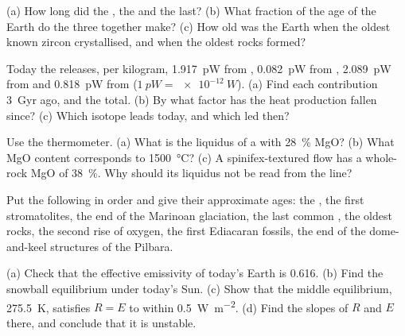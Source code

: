 \begin{exercise}[$\star$]\label{exo:b2:precambrian-earth:1}
(a) How long did the , the  and the  last? (b) What fraction of the age
of the Earth do the three together make? (c) How old was the Earth when the oldest known zircon
crystallised, and when the oldest rocks formed?
\end{exercise}

\begin{exercise}[$\star$]\label{exo:b2:precambrian-earth:2}
Today the  releases, per kilogram, \qty{1.917}{pW} from ,
\qty{0.082}{pW} from , \qty{2.089}{pW} from  and \qty{0.818}{pW} from
 ($\qty{1}{pW} = \qty{e-12}{W}$). (a) Find each contribution \qty{3}{Gyr} ago, and
the total. (b) By what factor has the heat production fallen since? (c) Which isotope leads
today, and which led then?
\end{exercise}

\begin{exercise}[$\star$]\label{exo:b2:precambrian-earth:3}
Use the  thermometer. (a) What is the liquidus of a  with
\qty{28}{\percent} MgO? (b) What MgO content corresponds to \qty{1500}{\celsius}? (c) A
spinifex-textured flow has a whole-rock MgO of \qty{38}{\percent}. Why should its liquidus not
be read from the line?
\end{exercise}

\begin{exercise}[$\star$]\label{exo:b2:precambrian-earth:4}
Put the following in order and give their approximate ages: the , the
first stromatolites, the end of the Marinoan glaciation, the last common , the
oldest rocks, the second rise of oxygen, the first Ediacaran fossils, the end of the dome-and-keel
structures of the Pilbara.
\end{exercise}

\begin{exercise}[$\star\star$]\label{exo:b2:precambrian-earth:5}
(a) Check that the effective emissivity of today's Earth is 0.616. (b) Find the snowball
equilibrium under today's Sun. (c) Show that the middle equilibrium, \qty{275.5}{K}, satisfies
$R = E$ to within \qty{0.5}{W.m^{-2}}. (d) Find the slopes of $R$ and $E$ there, and conclude
that it is unstable.
\end{exercise}

